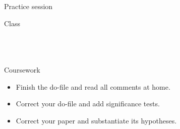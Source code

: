 \documentclass[t]{beamer}
\begin{document}
	\begin{frame}[t]{Practice session}

    \begin{block}{Class}
      \\
      \\
      
			\\
			\\    
    \end{block}

    \begin{alertblock}{Coursework}
      \begin{itemize}
	      \item Finish the do-file and read all comments at home.
	      \item Correct your do-file and add significance tests.
	      \item Correct your paper and substantiate its hypotheses.
      \end{itemize}
    \end{alertblock}
    		
	\end{frame}
		
\end{document}
